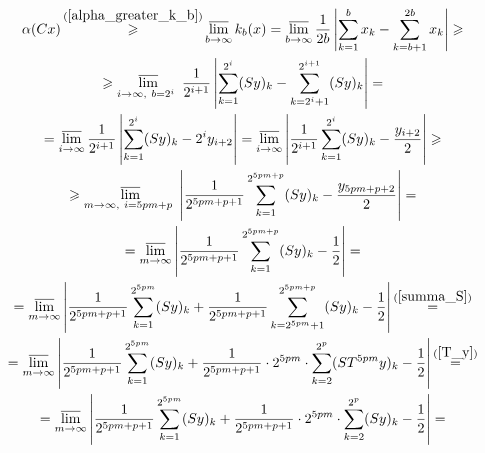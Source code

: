 \begin{multline*}
	\alpha (Cx) \mathop{\geq}^{(\ref{alpha_greater_k_b})}
	\varlimsup_{b\to \infty} k_b(x) =
	\varlimsup_{b\to \infty}\frac{1}{2b}\left|
		\sum_{k=1}^{b}x_k - \sum_{k=b+1}^{2b}x_k
	\right| \geq
	\\ \geq
	\varlimsup_{
		i\to \infty,~
		b=2^i~
	}\frac{1}{2^{i+1}}\left|
		\sum_{k=1}^{2^i}(Sy)_k - \sum_{k=2^i+1}^{2^{i+1}}(Sy)_k
	\right| =
	\\=
	\varlimsup_{i\to \infty}\frac{1}{2^{i+1}}\left|
		\sum_{k=1}^{2^i}(Sy)_k - 2^i y_{i+2}
	\right| =
	\varlimsup_{i\to \infty}\left|
		\frac{1}{2^{i+1}}\sum_{k=1}^{2^i}(Sy)_k - \frac{y_{i+2}}{2}
	\right| \geq
	\\ \geq
	\varlimsup_{
		m\to \infty,~
		i=5pm+p~
	}\left|
		\frac{1}{2^{5pm+p+1}}\sum_{k=1}^{2^{5pm+p}}(Sy)_k - \frac{y_{5pm+p+2}}{2}
	\right| =
	\\=
	\varlimsup_{m\to \infty}\left|
		\frac{1}{2^{5pm+p+1}}\sum_{k=1}^{2^{5pm+p}}(Sy)_k - \frac{1}{2}
	\right| =
	\\=
	\varlimsup_{m\to \infty}\left|
		\frac{1}{2^{5pm+p+1}}\sum_{k=1}^{2^{5pm}}(Sy)_k
		+
		\frac{1}{2^{5pm+p+1}}\sum_{k=2^{5pm}+1}^{2^{5pm+p}}(Sy)_k
		- \frac{1}{2}
	\right|
	\mathop{=}^{(\ref{summa_S})}
	\\=
	\varlimsup_{m\to \infty}\left|
		\frac{1}{2^{5pm+p+1}}\sum_{k=1}^{2^{5pm}}(Sy)_k
		+
		\frac{1}{2^{5pm+p+1}} \cdot 2^{5pm} \cdot \sum_{k=2}^{2^p}(ST^{5pm}y)_k
		- \frac{1}{2}
	\right|
	\mathop{=}^{(\ref{T_y})}
	\\=
	\varlimsup_{m\to \infty}\left|
		\frac{1}{2^{5pm+p+1}}\sum_{k=1}^{2^{5pm}}(Sy)_k
		+
		\frac{1}{2^{5pm+p+1}} \cdot 2^{5pm} \cdot \sum_{k=2}^{2^p}(Sy)_k
		- \frac{1}{2}
	\right| =
\end{multline*}

